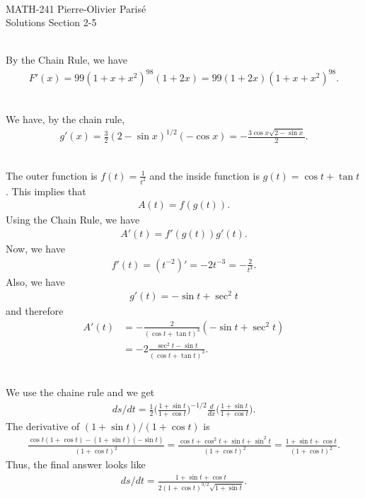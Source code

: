 


	\noindent \hrulefill \\
	MATH-241 \hfill Pierre-Olivier Paris{\'e}\\
	Solutions Section 2-5 \hfill \semester \\\vspace*{-1cm}
	
	\noindent\hrulefill
	
	\spc
	
	\\
	By the Chain Rule, we have
		\begin{align*}
		F'(x) = 99 (1 + x + x^2)^{98} (1 + 2x) = 99 (1 + 2x) (1 + x + x^2)^{98} .
		\end{align*}
	
	\spc
	
	\\
	We have, by the chain rule,
		\begin{align*}
		g'(x) = \frac{3}{2} (2 - \sin x)^{1/2} (-\cos x) = -\frac{3 \cos x \sqrt{2 - \sin x}}{2} .
		\end{align*}
	
	\spc
	
	\\
	The outer function is $f(t) = \frac{1}{t^2}$ and the inside function is $g(t) = \cos t + \tan t$. This implies that 
		\begin{align*}
		A (t) = f (g (t)) .
		\end{align*} 
	Using the Chain Rule, we have
		\begin{align*}
		A' (t) = f' (g (t)) g' (t) .
		\end{align*}
	Now, we have
		\begin{align*}
		f'(t) = (t^{-2})' = -2 t^{-3} = -\frac{2}{t^3} .
		\end{align*}
	Also, we have
		\begin{align*}
		g' (t) = -\sin t + \sec^2 t
		\end{align*}
	and therefore
		\begin{align*}
		A' (t) &= -\frac{2}{(\cos t + \tan t)^3} (-\sin t + \sec^2 t)  \\
		&= - 2\frac{\sec^2 t - \sin t}{(\cos t + \tan t)^3} .
		\end{align*}
		
	\spc
	
	\\
	We use the chaine rule and we get
		\begin{align*}
		ds/dt = \frac{1}{2} \Big( \frac{1 + \sin t}{1 + \cos t} \Big)^{-1/2} \frac{d}{dx} \Big( \frac{1 + \sin t}{1 + \cos t} \Big) .
		\end{align*}
	The derivative of $(1 +\sin t)/(1 + \cos t)$ is
		\begin{align*}
		\frac{\cos t (1 + \cos t) - (1 + \sin t) (-\sin t)}{(1 + \cos t)^2} = \frac{\cos t + \cos^2 t + \sin t + \sin^2 t}{(1 + \cos t)^2} = \frac{1 + \sin t + \cos t}{(1 + \cos t)^2} .
		\end{align*}
	Thus, the final answer looks like
		\begin{align*}
		ds/dt = \frac{1 + \sin t + \cos t}{2 (1 + \cos t)^{3/2} \sqrt{1 + \sin t}} .
		\end{align*}
	
	
